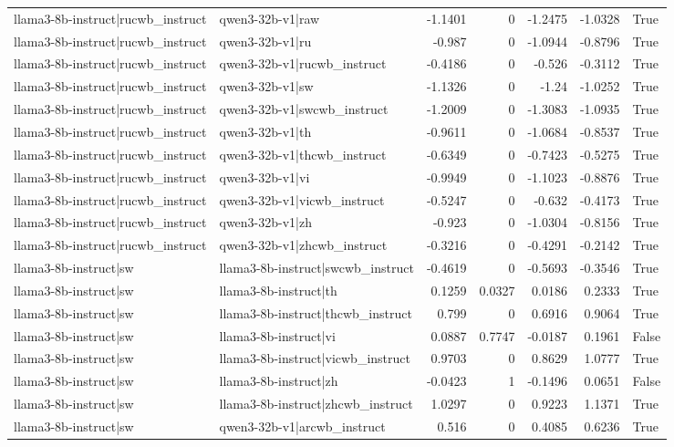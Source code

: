 \begin{table}
\begin{tabular}{l l r r r r l}
llama3-8b-instruct|rucwb_instruct & qwen3-32b-v1|raw & -1.1401 & 0 & -1.2475 & -1.0328 & True \\
llama3-8b-instruct|rucwb_instruct & qwen3-32b-v1|ru & -0.987 & 0 & -1.0944 & -0.8796 & True \\
llama3-8b-instruct|rucwb_instruct & qwen3-32b-v1|rucwb_instruct & -0.4186 & 0 & -0.526 & -0.3112 & True \\
llama3-8b-instruct|rucwb_instruct & qwen3-32b-v1|sw & -1.1326 & 0 & -1.24 & -1.0252 & True \\
llama3-8b-instruct|rucwb_instruct & qwen3-32b-v1|swcwb_instruct & -1.2009 & 0 & -1.3083 & -1.0935 & True \\
llama3-8b-instruct|rucwb_instruct & qwen3-32b-v1|th & -0.9611 & 0 & -1.0684 & -0.8537 & True \\
llama3-8b-instruct|rucwb_instruct & qwen3-32b-v1|thcwb_instruct & -0.6349 & 0 & -0.7423 & -0.5275 & True \\
llama3-8b-instruct|rucwb_instruct & qwen3-32b-v1|vi & -0.9949 & 0 & -1.1023 & -0.8876 & True \\
llama3-8b-instruct|rucwb_instruct & qwen3-32b-v1|vicwb_instruct & -0.5247 & 0 & -0.632 & -0.4173 & True \\
llama3-8b-instruct|rucwb_instruct & qwen3-32b-v1|zh & -0.923 & 0 & -1.0304 & -0.8156 & True \\
llama3-8b-instruct|rucwb_instruct & qwen3-32b-v1|zhcwb_instruct & -0.3216 & 0 & -0.4291 & -0.2142 & True \\
llama3-8b-instruct|sw & llama3-8b-instruct|swcwb_instruct & -0.4619 & 0 & -0.5693 & -0.3546 & True \\
llama3-8b-instruct|sw & llama3-8b-instruct|th & 0.1259 & 0.0327 & 0.0186 & 0.2333 & True \\
llama3-8b-instruct|sw & llama3-8b-instruct|thcwb_instruct & 0.799 & 0 & 0.6916 & 0.9064 & True \\
llama3-8b-instruct|sw & llama3-8b-instruct|vi & 0.0887 & 0.7747 & -0.0187 & 0.1961 & False \\
llama3-8b-instruct|sw & llama3-8b-instruct|vicwb_instruct & 0.9703 & 0 & 0.8629 & 1.0777 & True \\
llama3-8b-instruct|sw & llama3-8b-instruct|zh & -0.0423 & 1 & -0.1496 & 0.0651 & False \\
llama3-8b-instruct|sw & llama3-8b-instruct|zhcwb_instruct & 1.0297 & 0 & 0.9223 & 1.1371 & True \\
llama3-8b-instruct|sw & qwen3-32b-v1|arcwb_instruct & 0.516 & 0 & 0.4085 & 0.6236 & True \\

\end{tabular}
\end{table}
